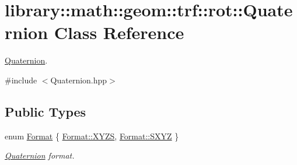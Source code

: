 \hypertarget{classlibrary_1_1math_1_1geom_1_1trf_1_1rot_1_1_quaternion}{}\section{library\+:\+:math\+:\+:geom\+:\+:trf\+:\+:rot\+:\+:Quaternion Class Reference}
\label{classlibrary_1_1math_1_1geom_1_1trf_1_1rot_1_1_quaternion}


\hyperlink{classlibrary_1_1math_1_1geom_1_1trf_1_1rot_1_1_quaternion}{Quaternion}.  




{\ttfamily \#include $<$Quaternion.\+hpp$>$}

\subsection*{Public Types}
\begin{DoxyCompactItemize}
\item 
enum \hyperlink{classlibrary_1_1math_1_1geom_1_1trf_1_1rot_1_1_quaternion_a2ca851b117657819310fe5a9b9e5d681}{Format} \{ \hyperlink{classlibrary_1_1math_1_1geom_1_1trf_1_1rot_1_1_quaternion_a2ca851b117657819310fe5a9b9e5d681a11c51ecd5dc6f86ba3c1ae79e21482f5}{Format\+::\+X\+Y\+ZS}, 
\hyperlink{classlibrary_1_1math_1_1geom_1_1trf_1_1rot_1_1_quaternion_a2ca851b117657819310fe5a9b9e5d681abd514d63fd7944bc7d3718aeef3684be}{Format\+::\+S\+X\+YZ}
 \}\begin{DoxyCompactList}\small\item\em \hyperlink{classlibrary_1_1math_1_1geom_1_1trf_1_1rot_1_1_quaternion}{Quaternion} format. \end{DoxyCompactList}
\end{DoxyCompactItemize}
